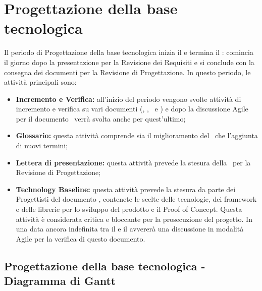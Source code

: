 \documentclass[PianoDiProgetto.tex]{subfiles}
\begin{document}
\section{Progettazione della base tecnologica}
Il periodo di Progettazione della base tecnologica inizia il  e termina il : comincia il giorno dopo la presentazione per la Revisione dei Requisiti e si conclude con la consegna dei documenti per la Revisione di Progettazione. In questo periodo, le attività principali sono:
\begin{itemize}
	\item \textbf{Incremento e Verifica:} all'inizio del periodo vengono svolte attività di incremento e verifica su vari documenti (\ndp, \pdp, \pdq\ e \adr) e dopo la discussione Agile per il documento \tb\ verrà svolta anche per quest'ultimo;
	\item \textbf{Glossario:} questa attività comprende sia il miglioramento del \g\ che l'aggiunta di nuovi termini;
	\item \textbf{Lettera di presentazione:} questa attività prevede la stesura della \ per la Revisione di Progettazione;
	\item \textbf{Technology Baseline:} questa attività prevede la stesura da parte dei Progettisti del documento \tb, contenete le scelte delle tecnologie, dei framework e delle librerie per lo sviluppo del prodotto e il Proof of Concept. Questa attività è considerata critica e bloccante per la prosecuzione del progetto. In una data ancora indefinita tra il  e il  avvererà una discussione in modalità Agile per la verifica di questo documento.
\end{itemize}
\begin{landscape}
	\subsection{Progettazione della base tecnologica - Diagramma di Gantt}
\end{landscape}
\end{document}
